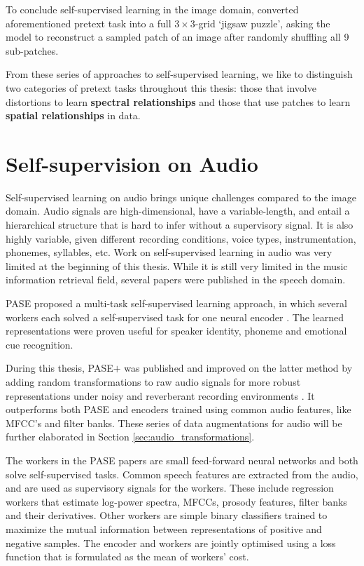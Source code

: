To conclude self-supervised learning in the image domain, \cite{noroozi_unsupervised_2016} converted aforementioned pretext task into a full $3\times 3$-grid `jigsaw puzzle', asking the model to reconstruct a sampled patch of an image after randomly shuffling all 9 sub-patches.

From these series of approaches to self-supervised learning, we like to distinguish two categories of pretext tasks throughout this thesis: those that involve distortions to learn \textbf{spectral relationships} and those that use patches to learn \textbf{spatial relationships} in data.

\section{Self-supervision on Audio}\label{sec:self_supervision_audio}
Self-supervised learning on audio brings unique challenges compared to the image domain.
Audio signals are high-dimensional, have a variable-length, and entail a hierarchical structure that is hard to infer without a supervisory signal.
It is also highly variable, given different recording conditions, voice types, instrumentation, phonemes, syllables, etc.
Work on self-supervised learning in audio was very limited at the beginning of this thesis.
While it is still very limited in the music information retrieval field, several papers were published in the speech domain.

PASE proposed a multi-task self-supervised learning approach, in which several workers each solved a self-supervised task for one neural encoder \cite{Pascual2019}.
The learned representations were proven useful for speaker identity, phoneme and emotional cue recognition.

During this thesis, PASE$+$ was published and improved on the latter method by adding random transformations to raw audio signals for more robust representations under noisy and reverberant recording environments \cite{Ravanelli2020}.
It outperforms both PASE and encoders trained using common audio features, like MFCC's and filter banks. These series of data augmentations for audio will be further elaborated in Section \ref{sec:audio_transformations}.

The workers in the PASE papers are small feed-forward neural networks and both solve self-supervised tasks.
Common speech features are extracted from the audio, and are used as supervisory signals for the workers.
These include regression workers that estimate log-power spectra, MFCCs, prosody features, filter banks and their derivatives.
Other workers are simple binary classifiers trained to maximize the mutual information between representations of positive and negative samples.
The encoder and workers are jointly optimised using a loss function that is formulated as the mean of workers' cost.


